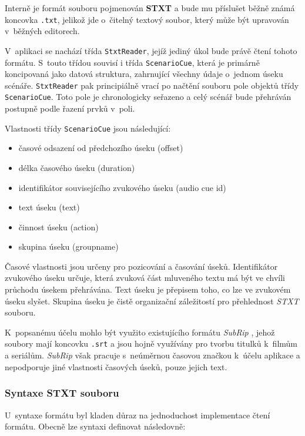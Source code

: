 Interně je formát souboru pojmenován \textbf{STXT} a bude mu příslušet
běžně známá koncovka \texttt{.txt}, jelikož jde o~čitelný textový
soubor, který může být upravován v~běžných editorech.

V~aplikaci se nachází třída \texttt{StxtReader}, jejíž jediný úkol bude
právě čtení tohoto formátu. S~touto třídou souvisí i třída 
\texttt{ScenarioCue}, která je primárně koncipovaná jako datová
struktura, zahrnující všechny údaje o~jednom úseku scénáře.
\texttt{StxtReader} pak principiálně vrací po načtění souboru pole objektů třídy
\texttt{ScenarioCue}. Toto pole je chronologicky seřazeno a celý scénář
bude přehráván postupně podle řazení prvků v~poli.

Vlastnosti třídy \texttt{ScenarioCue} jsou následující:

\begin{itemize}
\tightlist
\item
  časové odsazení od předchozího úseku (offset)
\item
  délka časového úseku (duration)
\item
  identifikátor souvisejícího zvukového úseku (audio cue id)
\item
  text úseku (text)
\item
  činnost úseku (action)
\item
  skupina úseku (groupname)
\end{itemize}

Časové vlastnosti jsou určeny pro pozicování a časování úseků.
Identifikátor zvukového úseku určuje, která zvuková část mluveného textu má být ve
chvíli průchodu úsekem přehrávána. Text úseku je přepisem toho, co
lze ve zvukovém úseku slyšet. Skupina úseku je čistě organizační
záležitostí pro přehlednost \emph{STXT} souboru.

K~popsanému účelu mohlo být využito existujícího formátu \emph{SubRip} \autocite{subrip},
jehož soubory mají koncovku \texttt{.srt} a jsou hojně využívány pro
tvorbu titulků k~filmům a seriálům. \emph{SubRip} však pracuje
s~neúměrnou časovou značkou k~účelu aplikace a nepodporuje jiné vlastnosti
časových úseků, pouze jejich text.

\subsubsection{Syntaxe STXT souboru}\label{syntaxe-stxt-souboru}

U~syntaxe formátu byl kladen důraz na jednoduchost implementace čtení
formátu. Obecně lze syntaxi definovat následovně:

